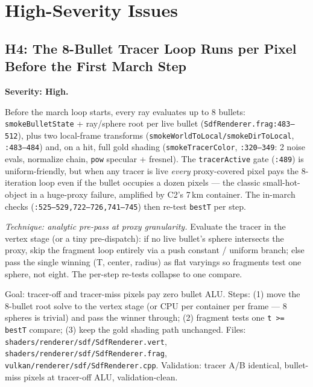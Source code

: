 \documentclass[11pt,a4paper]{article}
\begin{document}
\section{High-Severity Issues}

\subsection{H4: The 8-Bullet Tracer Loop Runs per Pixel Before the First March Step}

\textbf{Severity: High.}

Before the march loop starts, every ray evaluates up to 8 bullets:
\texttt{smokeBulletState} + ray/sphere root per live bullet
(\texttt{SdfRenderer.frag:483--512}), plus two local-frame transforms
(\texttt{smokeWorldToLocal/smokeDirToLocal}, \texttt{:483--484}) and, on a
hit, full gold shading (\texttt{smokeTracerColor}, \texttt{:320--349}: 2
noise evals, normalize chain, \texttt{pow} specular + fresnel). The
\texttt{tracerActive} gate (\texttt{:489}) is uniform-friendly, but when any
tracer is live \emph{every} proxy-covered pixel pays the 8-iteration loop even
if the bullet occupies a dozen pixels --- the classic small-hot-object in a
huge-proxy failure, amplified by C2's 7\,km container. The in-march checks
(\texttt{:525--529,722--726,741--745}) then re-test \texttt{bestT} per step.

\textit{Technique: analytic pre-pass at proxy granularity.} Evaluate the
tracer in the vertex stage (or a tiny pre-dispatch): if no live bullet's
sphere intersects the proxy, skip the fragment loop entirely via a push
constant / uniform branch; else pass the single winning (T, center, radius)
as flat varyings so fragments test one sphere, not eight. The per-step
re-tests collapse to one compare.

\begin{tcolorbox}[promptbox={Prompt --- H4: proxy-granularity tracer}]
Goal: tracer-off and tracer-miss pixels pay zero bullet ALU. Steps: (1) move
the 8-bullet root solve to the vertex stage (or CPU per container per frame
--- 8 spheres is trivial) and pass the winner through; (2) fragment tests one
\texttt{t >= bestT} compare; (3) keep the gold shading path unchanged.
Files: \texttt{shaders/renderer/sdf/SdfRenderer.vert},
\texttt{shaders/renderer/sdf/SdfRenderer.frag},
\texttt{vulkan/renderer/sdf/SdfRenderer.cpp}. Validation: tracer A/B
identical, bullet-miss pixels at tracer-off ALU, validation-clean.
\end{tcolorbox}
\end{document}
